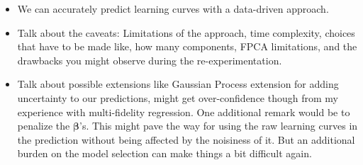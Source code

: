 \begin{itemize}
  \item We can accurately predict learning curves with a data-driven approach.
  \item Talk about the caveats: Limitations of the approach, time complexity, choices that have to be made like, how many components, FPCA limitations, and the drawbacks you might observe during the re-experimentation.
  \item Talk about possible extensions like Gaussian Process extension for adding uncertainty to our predictions, might get over-confidence though from my experience with multi-fidelity regression. One additional remark would be to penalize the $\boldsymbol{\beta}$'s. This might pave the way for using the raw learning curves in the prediction without being affected by the noisiness of it. But an additional burden on the model selection can make things a bit difficult again.
\end{itemize}
